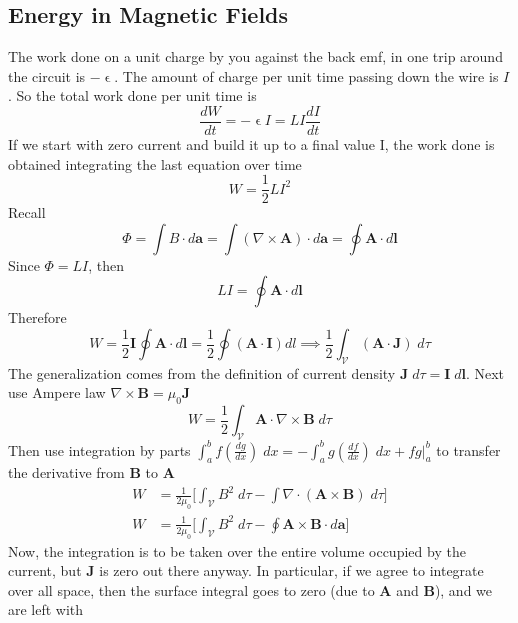 \documentclass[../../../main.tex]{subfiles}
\begin{document}
\subsection{Energy in Magnetic Fields}
The work done on a unit charge by you against the back emf, in one trip around the circuit is $-\upvarepsilon$. The amount of charge per unit time passing down the wire is $I $. So the total work done per unit time is
\begin{equation*}
    \frac{dW}{dt}=-\upvarepsilon I=LI\frac{dI}{dt}
\end{equation*}
If we start with zero current and build it up to a ﬁnal value I, the work done is obtained integrating the last equation over time
\begin{equation*}
    W=\frac{1}{2}LI^2
\end{equation*}
Recall
\begin{equation*}
    \Phi = \int B \cdot d \mathbf{a} = \int (\nabla \times \mathbf{A}) \cdot d \mathbf{a} = \oint \mathbf{A} \cdot d \mathbf{l}
\end{equation*}
Since $\Phi=LI$, then
\begin{equation*}
    LI=\oint \mathbf{A} \cdot d \mathbf{l}
\end{equation*}
Therefore
\begin{equation*}
    W = \frac{1}{2} \mathbf{I} \oint \mathbf{A} \cdot d \mathbf{l} = \frac{1}{2} \oint (\mathbf{A} \cdot \mathbf{I}) dl \implies \frac{1}{2} \int_\mathcal{V} (\mathbf{A} \cdot \mathbf{J}) \;d\tau
\end{equation*}
The generalization comes from the definition of current density $    \mathbf{J}\;d\tau = \mathbf{I}\;d \mathbf{l}$.
Next use Ampere law $\nabla  \times \mathbf{B}=\mu_0 \mathbf{J}$
\begin{equation*}
    W  = \frac{1}{2} \int_\mathcal{V} \mathbf{A} \cdot \nabla \times \mathbf{B} \;d\tau
\end{equation*}
Then use integration by parts $    \int_{a}^{b} f(\frac{dg}{dx})\;dx=-\int_{a}^{b} g\left(\frac{df}{dx}\right)\;dx+ fg \lvert_{a}^{b}$ to transfer the derivative from $\mathbf{B}$ to $\mathbf{A}$
\begin{align*}
    W & = \frac{1}{2\mu_0}\bigg[\int_\mathcal{V} B^2\;d\tau-\int \nabla \cdot ( \mathbf{A}\times \mathbf{B}) \;d\tau\bigg] \\
    W & = \frac{1}{2\mu_0}\bigg[\int_\mathcal{V} B^2\;d\tau-\oint \mathbf{A}\times \mathbf{B}\cdot d\mathbf{a}\bigg]
\end{align*}
Now, the integration is to be taken over the entire volume occupied by the current, but \textbf{J} is zero out there anyway. In particular, if we agree to integrate over all space, then the surface integral goes to zero (due to $\mathbf{A}$ and $\mathbf{B}$), and we are left with
\end{document}
